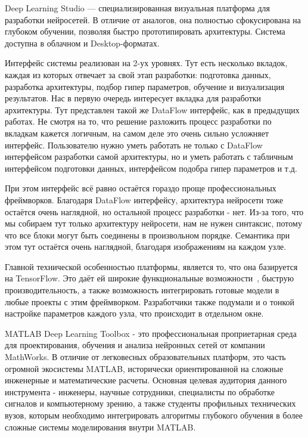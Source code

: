 \documentclass{report}
\begin{document}
Deep Learning Studio — специализированная визуальная платформа для разработки нейросетей. В отличие от аналогов, она полностью сфокусирована на глубоком обучении, позволяя быстро прототипировать архитектуры. Система доступна в облачном и Desktop-форматах.


Интерфейс системы реализован на 2-ух уровнях. Тут есть несколько вкладок, каждая из которых отвечает за свой этап разработки: подготовка данных, разработка архитектуры, подбор гипер параметров, обучение и визуализация результатов. Нас в первую очередь интересует вкладка для разработки архитектуры. Тут представлен такой же DataFlow интерфейс, как в предыдущих работах. Не смотря на то, что решение разложить процесс разработки по вкладкам кажется логичным, на самом деле это очень сильно усложняет интерфейс. Пользователю нужно уметь работать не только с DataFlow интерфейсом разработки самой архитектуры, но и уметь работать с табличным интерфейсом подготовки данных, интерфейсом подобра гипер параметров и т.д.

При этом интерфейс всё равно остаётся гораздо проще профессиональных фреймворков. Благодаря DataFlow интерфейсу, архитектура нейросети тоже остаётся очень наглядной, но остальной процесс разработки - нет. Из-за того, что мы собираем тут только архитектуру нейросети, нам не нужен синтаксис, потому что все блоки могут быть соединены в произвольном порядке. Семантика при этом тут остаётся очень наглядной, благодаря изображениям на каждом узле. 

Главной технической особенностью платформы, является то, что она базируется на TensorFlow. Это даёт ей широкие функциональные возможности~\cite{bib_tensorflow}, быструю производительность, а также возможность интегрировать готовые модели в любые проекты с этим фреймворком. Разработчики также подумали и о тонкой настройке параметров каждого узла, что происходит в отдельном окне.

MATLAB Deep Learning Toolbox - это профессиональная проприетарная среда для проектирования, обучения и анализа нейронных сетей от компании MathWorks. В отличие от легковесных образовательных платформ, это часть огромной экосистемы MATLAB, исторически ориентированной на сложные инженерные и математические расчеты. Основная целевая аудитория данного инструмента - инженеры, научные сотрудники, специалисты по обработке сигналов и компьютерному зрению, а также студенты профильных технических вузов, которым необходимо интегрировать алгоритмы глубокого обучения в более сложные системы моделирования внутри MATLAB.
\end{document}
